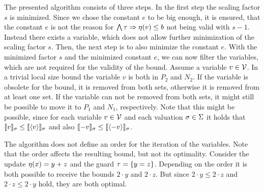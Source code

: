 The presented algorithm consists of three steps.
In the first step the scaling factor $s$ is minimized.
Since we chose the constant $e$ to be big enough, it is ensured, that the constant $e$ is not the reason for $\bigwedge \tau \Rightarrow \eta(v) \leq b$ not being valid with $s-1$.
Instead there exists a variable, which does not allow further minimization of the scaling factor $s$.
Then, the next step is to also minimize the constant $e$.
With the minimized factor $s$ and the minimized constant $e$, we can now filter the variables, which are not required for the validity of the bound.
Assume a variable $v \in \mathcal{V}$.
In a trivial local size bound the variable $v$ is both in $P_2$ and $N_2$.
If the variable is obsolete for the bound, it is removed from both sets, otherwise it is removed from at least one set.
If the variable can not be removed from both sets, it might still be possible to move it to $P_1$ and $N_1$, respectively.
Note that this might be possible, since for each variable $v \in \mathcal{V}$ and each valuation $\sigma \in \Sigma$ it holds that $\llbracket v \rrbracket_{\sigma} \leq \llbracket \langle v\rangle \rrbracket_{\sigma}$ and also $\llbracket -v \rrbracket_{\sigma} \leq \llbracket \langle-v\rangle \rrbracket_{\sigma}$.

The algorithm does not define an order for the iteration of the variables.
Note that the order affects the resulting bound, but not its optimality.
Consider the update $\eta(x) = y + z$ and the guard $\tau = \lbrace y = z \rbrace$.
Depending on the order it is both possible to receive the bounds $2 \cdot y$ and $2 \cdot z$.
But since $2 \cdot y \leq 2 \cdot z$ and $2 \cdot z \leq 2 \cdot y$ hold, they are both optimal.
